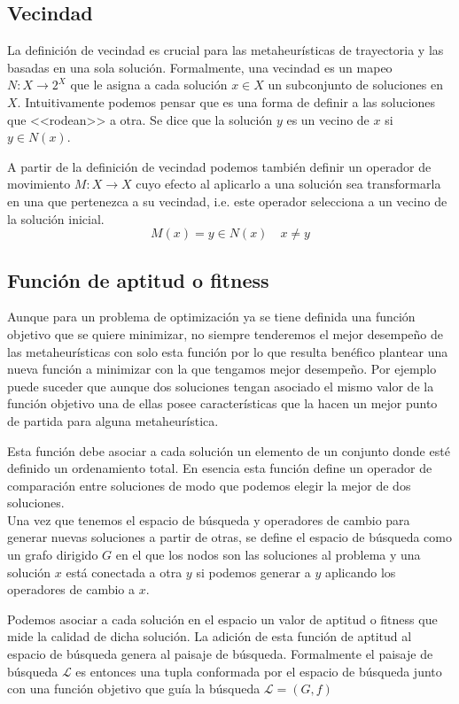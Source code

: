 \subsection{Vecindad}
La definición de vecindad es crucial para las metaheurísticas de trayectoria y las basadas en una sola solución.
Formalmente, una vecindad es un mapeo $N:X\rightarrow 2^X$ que le asigna a cada solución $x\in X$ un subconjunto de soluciones en $X$. Intuitivamente podemos pensar que es una forma de definir a las soluciones que <<rodean>> a otra. Se dice que la solución $y$ es un vecino de $x$ si $y\in N(x)$.

A partir de la definición de vecindad podemos también definir un operador de movimiento $M:X\rightarrow X$ cuyo efecto al aplicarlo a una solución sea transformarla en una que pertenezca a su vecindad, i.e. este operador selecciona a un vecino de la solución inicial.  
\[M(x)=y\in N(x)\quad x\neq y\]

\subsection{Función de aptitud o fitness}
Aunque para un problema de optimización ya se tiene definida una función objetivo que se quiere minimizar, no siempre tenderemos el mejor desempeño de las metaheurísticas con solo esta función por lo que resulta benéfico plantear una nueva función a minimizar con la que tengamos mejor desempeño. Por ejemplo puede suceder que aunque dos soluciones tengan asociado el mismo valor de la función objetivo una de ellas posee características que la hacen un mejor punto de partida para alguna metaheurística.

Esta función debe asociar a cada solución un elemento de un conjunto donde esté definido un ordenamiento total. En esencia esta función define un operador de comparación entre soluciones de modo que podemos elegir la mejor de dos soluciones.\\


Una vez que tenemos el espacio de búsqueda y operadores de cambio para generar nuevas soluciones a partir de otras, se define el espacio de búsqueda como un grafo dirigido $G$ en el que los nodos son las soluciones al problema y una solución $x$ está conectada a otra $y$ si podemos generar a $y$ aplicando los operadores de cambio a $x$.

Podemos asociar a cada solución en el espacio un valor de aptitud o fitness que mide la calidad de dicha solución. La adición de esta función de aptitud al espacio de búsqueda genera al paisaje de búsqueda. Formalmente el paisaje de búsqueda $\mathcal{L}$ es entonces una tupla conformada por el espacio de búsqueda junto con una función objetivo que guía la búsqueda $\mathcal{L}=(G,f)$

